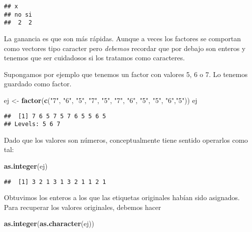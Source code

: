 \documentclass[]{article}
\newenvironment{Shaded}{\begin{snugshade}}{\end{snugshade}}
\newcommand{\KeywordTok}[1]{\textcolor[rgb]{0.13,0.29,0.53}{\textbf{#1}}}
\newcommand{\StringTok}[1]{\textcolor[rgb]{0.31,0.60,0.02}{#1}}
\newcommand{\NormalTok}[1]{#1}
\begin{document}
\begin{verbatim}
## x
## no si 
##  2  2
\end{verbatim}

La ganancia es que son más rápidas. Aunque a veces los factores se
comportan como vectores tipo caracter pero \emph{debemos} recordar que
por debajo son enteros y tenemos que ser cuidadosos si los tratamos como
caracteres.

Supongamos por ejemplo que tenemos un factor con valores 5, 6 o 7. Lo
tenemos guardado como factor.

\begin{Shaded}
\begin{Highlighting}[]
\NormalTok{ej <-}\StringTok{ }\KeywordTok{factor}\NormalTok{(}\KeywordTok{c}\NormalTok{(}\StringTok{"7"}\NormalTok{, }\StringTok{"6"}\NormalTok{, }\StringTok{"5"}\NormalTok{, }\StringTok{"7"}\NormalTok{, }\StringTok{"5"}\NormalTok{, }\StringTok{"7"}\NormalTok{, }\StringTok{"6"}\NormalTok{, }\StringTok{"5"}\NormalTok{, }\StringTok{"5"}\NormalTok{, }\StringTok{"6"}\NormalTok{,}\StringTok{"5"}\NormalTok{))}
\NormalTok{ej}
\end{Highlighting}
\end{Shaded}

\begin{verbatim}
##  [1] 7 6 5 7 5 7 6 5 5 6 5
## Levels: 5 6 7
\end{verbatim}

Dado que los valores son números, conceptualmente tiene sentido
operarlos como tal:

\begin{Shaded}
\begin{Highlighting}[]
\KeywordTok{as.integer}\NormalTok{(ej)}
\end{Highlighting}
\end{Shaded}

\begin{verbatim}
##  [1] 3 2 1 3 1 3 2 1 1 2 1
\end{verbatim}

Obtuvimos los enteros a los que las etiquetas originales habían sido
asignados. Para recuperar los valores originales, debemos hacer

\begin{Shaded}
\begin{Highlighting}[]
\KeywordTok{as.integer}\NormalTok{(}\KeywordTok{as.character}\NormalTok{(ej))}
\end{Highlighting}
\end{Shaded}
\end{document}
